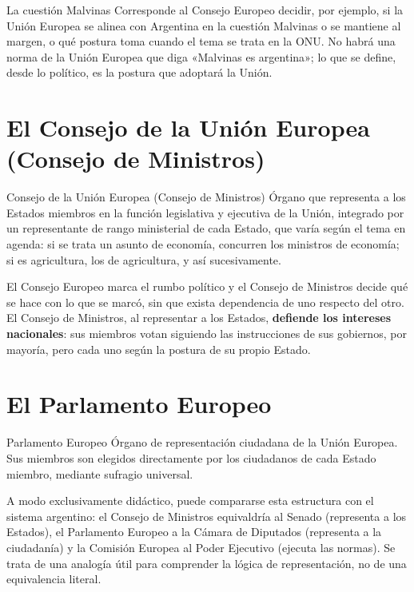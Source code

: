 \documentclass[12pt,oneside]{book}
\begin{document}
\begin{ejemplo}{La cuestión Malvinas}
Corresponde al Consejo Europeo decidir, por ejemplo, si la Unión Europea se alinea con Argentina en la cuestión Malvinas o se mantiene al margen, o qué postura toma cuando el tema se trata en la ONU. No habrá una norma de la Unión Europea que diga «Malvinas es argentina»; lo que se define, desde lo político, es la postura que adoptará la Unión.
\end{ejemplo}

\section{El Consejo de la Unión Europea (Consejo de Ministros)}

\begin{definicion}{Consejo de la Unión Europea (Consejo de Ministros)}
Órgano que representa a los Estados miembros en la función legislativa y ejecutiva de la Unión, integrado por un representante de rango ministerial de cada Estado, que varía según el tema en agenda: si se trata un asunto de economía, concurren los ministros de economía; si es agricultura, los de agricultura, y así sucesivamente.
\end{definicion}

El Consejo Europeo marca el rumbo político y el Consejo de Ministros decide qué se hace con lo que se marcó, sin que exista dependencia de uno respecto del otro. El Consejo de Ministros, al representar a los Estados, \textbf{defiende los intereses nacionales}: sus miembros votan siguiendo las instrucciones de sus gobiernos, por mayoría, pero cada uno según la postura de su propio Estado.

\section{El Parlamento Europeo}

\begin{definicion}{Parlamento Europeo}
Órgano de representación ciudadana de la Unión Europea. Sus miembros son elegidos directamente por los ciudadanos de cada Estado miembro, mediante sufragio universal.
\end{definicion}

\begin{nota}
A modo exclusivamente didáctico, puede compararse esta estructura con el sistema argentino: el Consejo de Ministros equivaldría al Senado (representa a los Estados), el Parlamento Europeo a la Cámara de Diputados (representa a la ciudadanía) y la Comisión Europea al Poder Ejecutivo (ejecuta las normas). Se trata de una analogía útil para comprender la lógica de representación, no de una equivalencia literal.
\end{nota}
\end{document}
